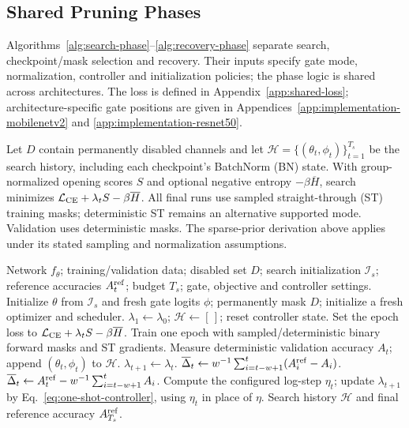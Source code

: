 \subsection{Shared Pruning Phases}
\label{sec:shared-phases}

Algorithms~\ref{alg:search-phase}--\ref{alg:recovery-phase} separate
search, checkpoint/mask selection and recovery. Their inputs specify
gate mode, normalization, controller and initialization policies;
the phase logic is shared across architectures. The loss is defined in
Appendix~\ref{app:shared-loss}; architecture-specific gate positions are
given in Appendices~\ref{app:implementation-mobilenetv2} and
\ref{app:implementation-resnet50}.

Let $D$ contain permanently disabled channels and let
$\mathcal H=\{(\theta_t,\phi_t)\}_{t=1}^{T_s}$ be the search history,
including each checkpoint's BatchNorm (BN) state. With group-normalized
opening scores $S$ and optional negative entropy $-\beta\overline H$,
search minimizes $\mathcal L_{\rm CE}+\lambda_t S-\beta\overline H$.
All final runs use sampled straight-through (ST) training masks;
deterministic ST remains an alternative supported mode.
Validation uses deterministic masks. The sparse-prior derivation above
applies under its stated sampling and normalization assumptions.

\begin{algorithm*}[!t]
\caption{Search: learn gate scores and save search checkpoints.}
\label{alg:search-phase}
\begin{algorithmic}[1]
\REQUIRE Network $f_\theta$; training/validation data; disabled set $D$;
search initialization $\mathcal I_s$; reference accuracies $A_t^{\rm ref}$;
budget $T_s$; gate, objective and controller settings.
\STATE Initialize $\theta$ from $\mathcal I_s$ and fresh gate logits $\phi$;
permanently mask $D$; initialize a fresh optimizer and scheduler.
\STATE $\lambda_1\gets\lambda_0$; $\mathcal H\gets[\,]$; reset controller state.
\STATE Set the epoch loss to $\mathcal L_{\rm CE}+\lambda_t S-\beta\overline H$.
\STATE Train one epoch with sampled/deterministic binary forward masks and ST gradients.
\STATE Measure deterministic validation accuracy $A_t$;
append $(\theta_t,\phi_t)$ to $\mathcal H$.
\STATE $\lambda_{t+1}\gets\lambda_t$.
\ELSE
{}
\STATE $\overline\Delta_t\gets w^{-1}\sum_{i=t-w+1}^{t}(A_i^{\rm ref}-A_i)$.
\ELSE
\STATE $\overline\Delta_t\gets A_t^{\rm ref}-w^{-1}\sum_{i=t-w+1}^{t}A_i$.
\ENDIF
\STATE Compute the configured log-step $\eta_t$; update $\lambda_{t+1}$
by Eq.~\eqref{eq:one-shot-controller}, using $\eta_t$ in place of $\eta$.
\ENDIF
\ENDFOR
\RETURN Search history $\mathcal H$ and final reference accuracy $A_{T_s}^{\rm ref}$.
\end{algorithmic}
\end{algorithm*}


